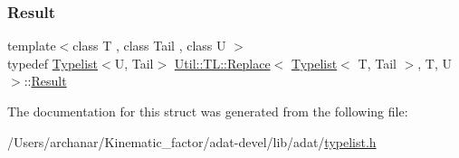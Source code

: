 \subsubsection{\texorpdfstring{Result}{Result}\hspace{0.1cm}{\footnotesize\ttfamily [3/3]}}
{\footnotesize\ttfamily template$<$class T , class Tail , class U $>$ \\
typedef \mbox{\hyperlink{structUtil_1_1Typelist}{Typelist}}$<$U, Tail$>$ \mbox{\hyperlink{structUtil_1_1TL_1_1Replace}{Util\+::\+T\+L\+::\+Replace}}$<$ \mbox{\hyperlink{structUtil_1_1Typelist}{Typelist}}$<$ T, Tail $>$, T, U $>$\+::\mbox{\hyperlink{structUtil_1_1TL_1_1Replace_3_01Typelist_3_01T_00_01Tail_01_4_00_01T_00_01U_01_4_a673e2d2a7c26a530c7015a04bde5a506}{Result}}}



The documentation for this struct was generated from the following file\+:\begin{DoxyCompactItemize}
\item 
/\+Users/archanar/\+Kinematic\+\_\+factor/adat-\/devel/lib/adat/\mbox{\hyperlink{adat-devel_2lib_2adat_2typelist_8h}{typelist.\+h}}\end{DoxyCompactItemize}
